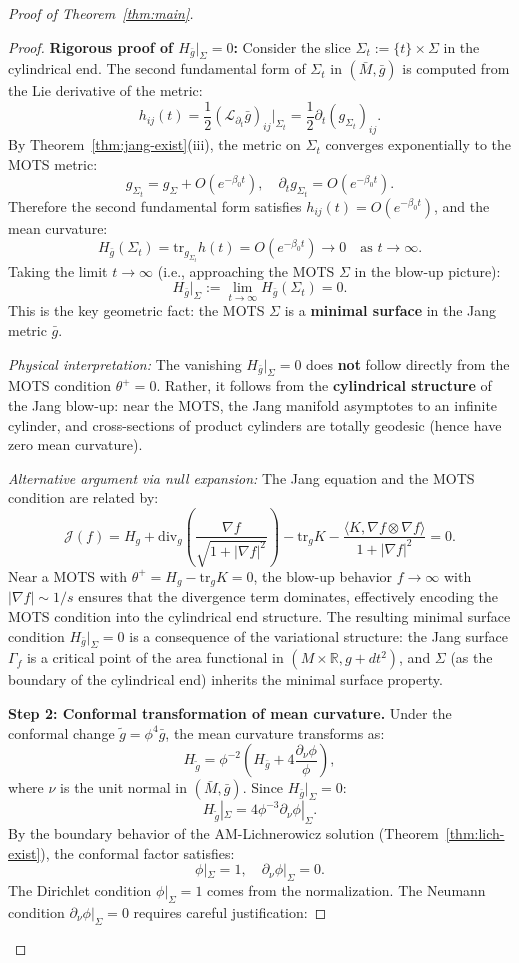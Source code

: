 \documentclass[12pt]{article}
\theoremstyle{plain}
\theoremstyle{definition}
\theoremstyle{remark}
\newcommand{\tr}{\mathrm{tr}}
\newcommand{\Div}{\mathrm{div}}
\newcommand{\tg}{\tilde{g}}
\newcommand{\bg}{\bar{g}}
\newcommand{\bM}{\bar{M}}
\begin{document}
\begin{proof}[Proof of Theorem~\ref{thm:main}]
\begin{proof}
\textbf{Rigorous proof of $H_{\bg}|_\Sigma = 0$:}
Consider the slice $\Sigma_t := \{t\} \times \Sigma$ in the cylindrical end. The second fundamental form of $\Sigma_t$ in $(\bM, \bg)$ is computed from the Lie derivative of the metric:
\[
h_{ij}(t) = \frac{1}{2}(\mathcal{L}_{\partial_t} \bg)_{ij}|_{\Sigma_t} = \frac{1}{2}\partial_t (g_{\Sigma_t})_{ij}.
\]
By Theorem~\ref{thm:jang-exist}(iii), the metric on $\Sigma_t$ converges exponentially to the MOTS metric:
\[
g_{\Sigma_t} = g_\Sigma + O(e^{-\beta_0 t}), \quad \partial_t g_{\Sigma_t} = O(e^{-\beta_0 t}).
\]
Therefore the second fundamental form satisfies $h_{ij}(t) = O(e^{-\beta_0 t})$, and the mean curvature:
\[
H_{\bg}(\Sigma_t) = \tr_{g_{\Sigma_t}} h(t) = O(e^{-\beta_0 t}) \to 0 \quad \text{as } t \to \infty.
\]
Taking the limit $t \to \infty$ (i.e., approaching the MOTS $\Sigma$ in the blow-up picture):
\begin{equation}\label{eq:hbg-sigma-zero}
H_{\bg}|_\Sigma := \lim_{t \to \infty} H_{\bg}(\Sigma_t) = 0.
\end{equation}
This is the key geometric fact: the MOTS $\Sigma$ is a \textbf{minimal surface} in the Jang metric $\bg$.

\textit{Physical interpretation:} The vanishing $H_{\bg}|_\Sigma = 0$ does \textbf{not} follow directly from the MOTS condition $\theta^+ = 0$. Rather, it follows from the \textbf{cylindrical structure} of the Jang blow-up: near the MOTS, the Jang manifold asymptotes to an infinite cylinder, and cross-sections of product cylinders are totally geodesic (hence have zero mean curvature).

\textit{Alternative argument via null expansion:}
The Jang equation and the MOTS condition are related by:
\[
\mathcal{J}(f) = H_g + \Div_g\left(\frac{\nabla f}{\sqrt{1+|\nabla f|^2}}\right) - \tr_g K - \frac{\langle K, \nabla f \otimes \nabla f\rangle}{1 + |\nabla f|^2} = 0.
\]
Near a MOTS with $\theta^+ = H_g - \tr_g K = 0$, the blow-up behavior $f \to \infty$ with $|\nabla f| \sim 1/s$ ensures that the divergence term dominates, effectively encoding the MOTS condition into the cylindrical end structure. The resulting minimal surface condition $H_{\bg}|_\Sigma = 0$ is a consequence of the variational structure: the Jang surface $\Gamma_f$ is a critical point of the area functional in $(M \times \mathbb{R}, g + dt^2)$, and $\Sigma$ (as the boundary of the cylindrical end) inherits the minimal surface property.

\textbf{Step 2: Conformal transformation of mean curvature.}
Under the conformal change $\tg = \phi^4\bg$, the mean curvature transforms as:
\[
H_{\tg} = \phi^{-2}\left(H_{\bg} + 4\frac{\partial_\nu \phi}{\phi}\right),
\]
where $\nu$ is the unit normal in $(\bM, \bg)$. Since $H_{\bg}|_\Sigma = 0$:
\[
H_{\tg}|_\Sigma = 4\phi^{-3}\partial_\nu\phi|_\Sigma.
\]
By the boundary behavior of the AM-Lichnerowicz solution (Theorem~\ref{thm:lich-exist}), the conformal factor satisfies:
\[
\phi|_\Sigma = 1, \quad \partial_\nu\phi|_\Sigma = 0.
\]
The Dirichlet condition $\phi|_\Sigma = 1$ comes from the normalization. The Neumann condition $\partial_\nu\phi|_\Sigma = 0$ requires careful justification:


\end{proof}
\end{proof}
\end{document}
